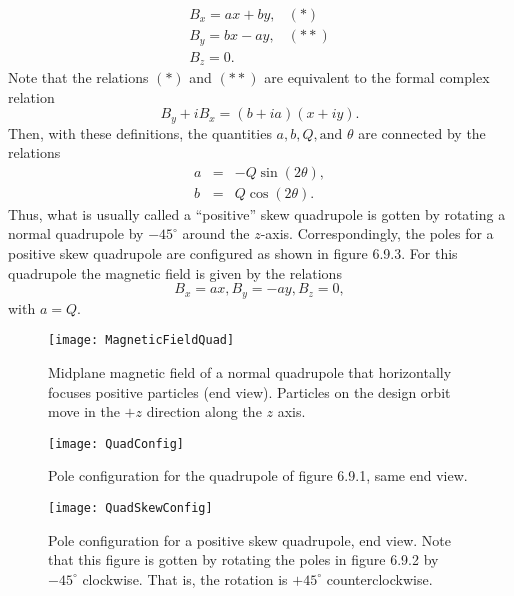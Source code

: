 \[\begin{array}{cl}
B_x=ax+by,&(*)\\
B_y=bx-ay,&(**)\\
B_z =0.
\end{array}\]
Note that the relations $(*)$ and $(**)$ are equivalent to the formal complex relation
\[ B_y + iB_x = (b+ia)(x+iy). \]
Then, with these definitions, the quantities $a, b, Q, \mbox{and } \theta$ are connected by the relations
\begin{eqnarray*}
a&=&-Q\sin(2\theta) ,\\
b&=&Q\cos(2\theta).
\end{eqnarray*}
Thus, what is usually called a ``positive'' skew quadrupole is gotten by
rotating a normal quadrupole by $-45^\circ$ around the $z$-axis.
Correspondingly, the poles for a positive skew quadrupole are configured as shown in figure 6.9.3.  For this quadrupole the magnetic field is given by the relations
\[ B_x=ax,B_y=-ay,B_z=0, \]
with $a=Q$.


\begin{figure}
  \centering
  \texttt{[image: MagneticFieldQuad]}
  \caption{Midplane magnetic field of a normal quadrupole that horizontally focuses positive particles (end view).
Particles on the design orbit move in the $+z$ direction along the $z$
axis.}
\end{figure}

\begin{figure}
  \centering
  \texttt{[image: QuadConfig]}
  \caption{Pole configuration for the quadrupole of figure 6.9.1, same end view.}
\end{figure}

\begin{figure}
  \centering
  \texttt{[image: QuadSkewConfig]}
  \caption{Pole configuration for a positive skew quadrupole, end view.
Note that this figure is gotten by rotating the poles in figure 6.9.2 by $-45^\circ$ clockwise.  That is, the rotation is $+45^\circ$ counterclockwise.}
\end{figure}

\clearpage


